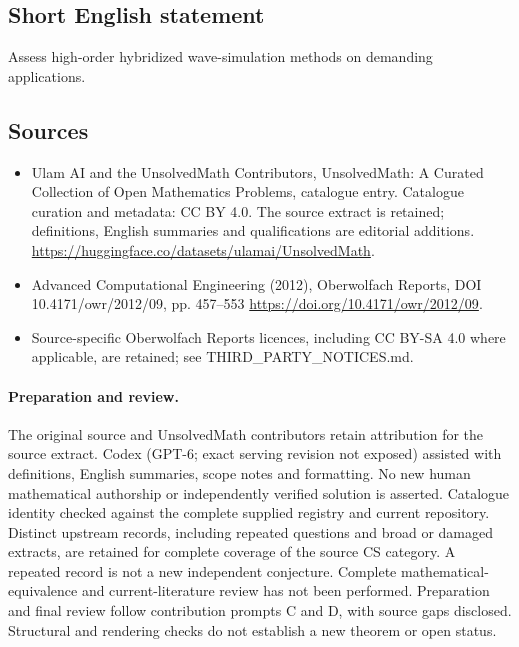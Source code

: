 \documentclass[11pt]{article}
\begin{document}
\subsection{Short English statement}
Assess high-order hybridized wave-simulation methods on demanding applications.
\subsection{Sources}
\begin{itemize}
\item[\hypertarget{source:statement:1}{S1}] Ulam AI and the UnsolvedMath Contributors, UnsolvedMath: A Curated Collection of Open Mathematics Problems, catalogue entry. Catalogue curation and metadata: CC BY 4.0. The source extract is retained; definitions, English summaries and qualifications are editorial additions.
\url{https://huggingface.co/datasets/ulamai/UnsolvedMath}.
\item[\hypertarget{source:statement:2}{S2}] Advanced Computational Engineering (2012), Oberwolfach Reports, DOI 10.4171/owr/2012/09, pp. 457--553
\url{https://doi.org/10.4171/owr/2012/09}.
\item Source-specific Oberwolfach Reports licences, including CC BY-SA 4.0 where applicable, are retained; see THIRD\_PARTY\_NOTICES.md.
\end{itemize}
\paragraph{Preparation and review.}
The original source and UnsolvedMath contributors retain attribution for the source extract. Codex (GPT-6; exact serving revision not exposed) assisted with definitions, English summaries, scope notes and formatting. No new human mathematical authorship or independently verified solution is asserted. Catalogue identity checked against the complete supplied registry and current repository. Distinct upstream records, including repeated questions and broad or damaged extracts, are retained for complete coverage of the source CS category. A repeated record is not a new independent conjecture. Complete mathematical-equivalence and current-literature review has not been performed. Preparation and final review follow contribution prompts C and D, with source gaps disclosed. Structural and rendering checks do not establish a new theorem or open status.
\label{end:statement}
\end{document}
